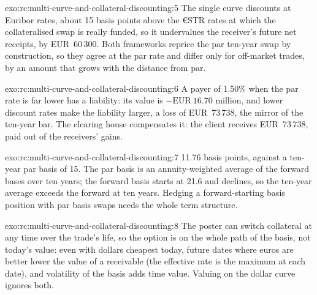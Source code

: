 \begin{solution}{exo:rc:multi-curve-and-collateral-discounting:5}
The single curve discounts at Euribor rates, about 15 basis points above the
€STR rates at which the collateralised swap is really funded, so it
undervalues the receiver's future net receipts, by EUR~60\,300. Both
frameworks reprice the par ten-year swap by construction, so they agree at the
par rate and differ only for off-market trades, by an amount that grows with
the distance from par.
\end{solution}

\begin{solution}{exo:rc:multi-curve-and-collateral-discounting:6}
A payer of 1.50\% when the par rate is far lower has a liability: its value
is $-\text{EUR}~16.70$ million, and lower discount rates make the liability
larger, a loss of EUR~73\,738, the mirror of the ten-year bar. The clearing
house compensates it: the client receives EUR~73\,738, paid out of the
receivers' gains.
\end{solution}

\begin{solution}{exo:rc:multi-curve-and-collateral-discounting:7}
11.76 basis points, against a ten-year par basis of 15. The par basis is an
annuity-weighted average of the forward bases over ten years; the forward basis
starts at 21.6 and declines, so the ten-year average exceeds the forward at
ten years. Hedging a forward-starting basis position with par basis swaps
needs the whole term structure.
\end{solution}

\begin{solution}{exo:rc:multi-curve-and-collateral-discounting:8}
The poster can switch collateral at any time over the trade's life, so the
option is on the whole path of the basis, not today's value: even with
dollars cheapest today, future dates where euros are better lower the value of
a receivable (the effective rate is the maximum at each date), and volatility
of the basis adds time value. Valuing on the dollar curve ignores both.
\end{solution}

